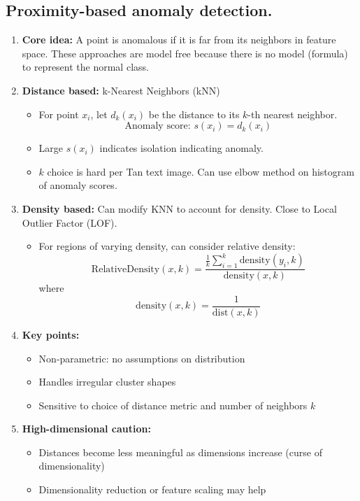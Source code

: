 \documentclass{article}
\begin{document}
\subsection*{Proximity-based anomaly detection.}

\begin{enumerate}
\item \textbf{Core idea:} A point is anomalous if it is far from its neighbors in feature space. These approaches are model free because there is no model (formula) to represent the normal class.

\item \textbf{Distance based:} k-Nearest Neighbors (kNN)
\begin{itemize}
\item For point $x_i$, let $d_k(x_i)$ be the distance to its $k$-th nearest neighbor.  
\[
\text{Anomaly score: } s(x_i) = d_k(x_i)
\]

\item Large $s(x_i)$ indicates isolation indicating anomaly.

\item $k$ choice is hard per Tan text image. Can use elbow method on histogram of anomaly scores.

\end{itemize}

\item \textbf{Density based:} Can modify KNN to account for density. Close to Local Outlier Factor (LOF).
\begin{itemize}

\item For regions of varying density, can consider relative density:
\[
\text{RelativeDensity}(x, k) = \frac{\frac{1}{k} \sum_{i=1}^k \text{density}(y_i, k)}{\text{density}(x, k)}
\]
where
\[
\text{density}(x, k) = \frac{1}{\text{dist}(x, k)}
\]
\end{itemize}

\item \textbf{Key points:}  
\begin{itemize}
        \item Non-parametric: no assumptions on distribution  
        \item Handles irregular cluster shapes  
        \item Sensitive to choice of distance metric and number of neighbors $k$
\end{itemize}

\item \textbf{High-dimensional caution:}  
    \begin{itemize}
        \item Distances become less meaningful as dimensions increase (curse of dimensionality)  
        \item Dimensionality reduction or feature scaling may help
    \end{itemize}
    

\end{enumerate}
\end{document}
